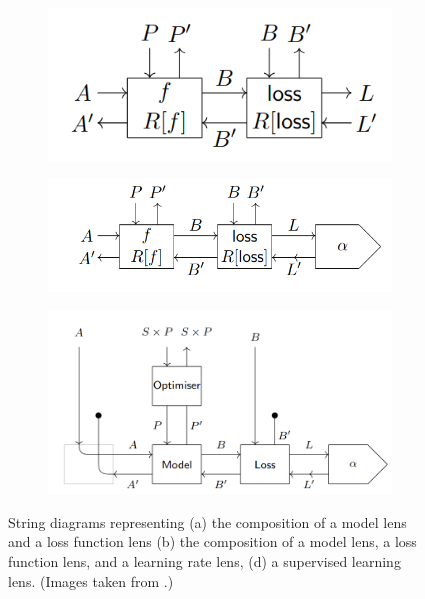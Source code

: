\documentclass[11pt,a4paper,openright,twoside]{report}
\theoremstyle{plain}
\theoremstyle{definition}
\begin{document}
\begin{figure}[h]
  \begin{center}
    \begin{subfigure}{0.3\textwidth}
      \includegraphics[width=\textwidth]{figures/lenses_model_loss.png}
      \caption{}
    \end{subfigure}
    \begin{subfigure}{0.4\textwidth}
      \includegraphics[width=\textwidth]{figures/lenses_model_loss_optimizer.png}
      \caption{}
    \end{subfigure}
    \begin{subfigure}{0.5\textwidth}
      \includegraphics[width=\textwidth]{figures/lenses_supervised_learning2.png}
      \caption{}
    \end{subfigure}                   
    \caption[Supervised learning with parametric lenses]{String diagrams representing (a) the composition of a model lens and a loss function lens (b) the composition of a model lens, a loss function lens, and a learning rate lens, (d) a supervised learning lens. (Images taken from \cite{cruttwell2022categorical}.)}
    \label{fig: suplearnlenses}
  \end{center}
\end{figure}
\end{document}
